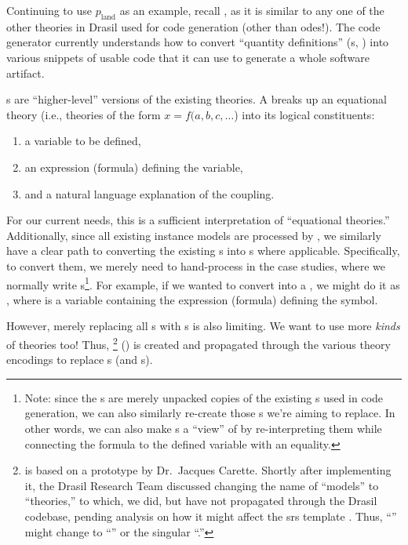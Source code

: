 Continuing to use \(p_\text{land}\) as an example, recall
, as it is similar to any one of the other
theories in Drasil used for code generation (other than \acsp{ode}!). The code
generator currently understands how to convert ``quantity definitions''
(\QDefinition{}s, ) into various snippets of
usable code that it can use to generate a whole software artifact.

\originalQDefinitionHaskell{}

\QDefinition{}s are ``higher-level'' versions of the existing theories. A
\QDefinition{} breaks up an equational theory (i.e., theories of the form \(x =
f(a, b, c, \ldots{}\)) into its logical constituents:
\begin{enumerate}
    \item a variable to be defined,
    \item an expression (formula) defining the variable,
    \item and a natural language explanation of the coupling.
\end{enumerate}

For our current needs, this is a sufficient interpretation of ``equational
theories.'' Additionally, since all existing instance models are processed by
\relToQD{}, we similarly have a clear path to converting the existing
\RelationConcept{}s into \QDefinition{}s where applicable. Specifically, to
convert them, we merely need to hand-process \relToQD{} in the case studies,
where we normally write \RelationConcept{}s\footnote{Note: since the
    \QDefinition{}s are merely unpacked copies of the existing \RelationConcept{}s
    used in code generation, we can also similarly re-create those
    \RelationConcept{}s we're aiming to replace. In other words, we can also make
    \RelationConcept{}s a ``view'' of \QDefinition{} by re-interpreting them while
    connecting the formula to the defined variable with an equality.}. For example,
if we wanted to convert  into a \QDefinition, we might do it
as , where  is a variable
containing the expression (formula) defining the  symbol.

\currentLandPosRCtoQD{}

However, merely replacing all \RelationConcept{}s with \QDefinition{}s is also
limiting. We want to use more \textit{kinds} of theories too! Thus,
\ModelKinds{} \footnote{\ModelKinds{} is based on a prototype by Dr.\ Jacques
    Carette. Shortly after implementing it, the Drasil Research Team discussed
    changing the name of ``models'' to ``theories,'' to which, we did, but have not
    propagated through the Drasil codebase, pending analysis on how it might affect
    the \acs{srs} template \cite{DrasilIssue2599RenamingModels}. Thus,
    ``\ModelKinds{}'' might change to ``\TheoryKinds{}'' or the singular
    ``\TheoryKind{}.''} () is created and
propagated through the various theory encodings to replace \RelationConcept{}s
(and \Relation{}s).

